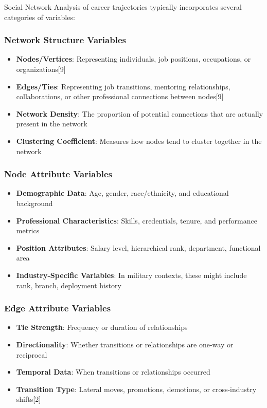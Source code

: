 \documentclass[
  letterpaper,
  DIV=11,
  numbers=noendperiod]{scrartcl}
\providecommand{\tightlist}{%
  \setlength{\itemsep}{0pt}\setlength{\parskip}{0pt}}
\begin{document}
Social Network Analysis of career trajectories typically incorporates
several categories of variables:

\subsubsection{Network Structure
Variables}\label{network-structure-variables}

\begin{itemize}
\tightlist
\item
  \textbf{Nodes/Vertices}: Representing individuals, job positions,
  occupations, or organizations{[}9{]}
\item
  \textbf{Edges/Ties}: Representing job transitions, mentoring
  relationships, collaborations, or other professional connections
  between nodes{[}9{]}
\item
  \textbf{Network Density}: The proportion of potential connections that
  are actually present in the network
\item
  \textbf{Clustering Coefficient}: Measures how nodes tend to cluster
  together in the network
\end{itemize}

\subsubsection{Node Attribute Variables}\label{node-attribute-variables}

\begin{itemize}
\tightlist
\item
  \textbf{Demographic Data}: Age, gender, race/ethnicity, and
  educational background
\item
  \textbf{Professional Characteristics}: Skills, credentials, tenure,
  and performance metrics
\item
  \textbf{Position Attributes}: Salary level, hierarchical rank,
  department, functional area
\item
  \textbf{Industry-Specific Variables}: In military contexts, these
  might include rank, branch, deployment history
\end{itemize}

\subsubsection{Edge Attribute Variables}\label{edge-attribute-variables}

\begin{itemize}
\tightlist
\item
  \textbf{Tie Strength}: Frequency or duration of relationships
\item
  \textbf{Directionality}: Whether transitions or relationships are
  one-way or reciprocal
\item
  \textbf{Temporal Data}: When transitions or relationships occurred
\item
  \textbf{Transition Type}: Lateral moves, promotions, demotions, or
  cross-industry shifts{[}2{]}
\end{itemize}
\end{document}
